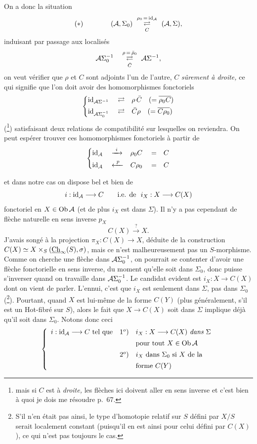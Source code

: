 On a donc la situation
\[
(*)\qquad\qquad(\cA,\Sigma_0)\ \underset{C}{\overset{\rho_0\,=\,\id_{\cA}}{\rightleftarrows}}\ (\cA,\Sigma),
\]
induisant par passage aux localisés
\[
\cA\Sigma_0^{-1}\quad\underset{\bar{C}}{\overset{\rho\,=\,\bar{\rho}_0}{\rightleftarrows}}\ \cA\Sigma^{-1},
\]
on veut vérifier que $\rho$ et $C$ sont adjoints l'un de l'autre, $C$ \textit{sûrement à droite,} ce qui signifie que l'on doit avoir des homomorphismes fonctoriels
\[
\left\{
\begin{aligned}
&\mathrm{id}_{\mathcal{A}\Sigma^{-1}}&&\rightleftarrows&&\rho\,\bar{C}\quad(=\overline{\rho_0C})\\
&\mathrm{id}_{\mathcal{A}\Sigma_0^{-1}}&&\rightleftarrows&&\bar{C}\rho\quad(=\overline{C\rho_0})
\end{aligned}
\right.
\]
(\footnote[41]{mais si $C$ est à \textit{droite,} les flèches ici doivent aller en sens inverse et c'est bien à quoi je dois me résoudre p.~67.}) satisfaisant deux relations de compatibilité sur lesquelles on reviendra. On peut espérer trouver ces homomorphismes fonctoriels à partir de
\[
\left\{
\begin{aligned}
&\id_{\cA}&&\xrightarrow{\ i\ }&&\rho_0C&&=&&C\\
&\id_{\cA}&&\xleftarrow{\ p\ }&&C\rho_0&&=&&C
\end{aligned}
\right.
\]

et dans notre cas on dispose bel et bien de
\[
i:\mathrm{id}_{\mathcal{A}}\longrightarrow C\qquad\text{i.e. de }\ i_X:X\longrightarrow C(X)
\]
fonctoriel en $X\in\mathrm{Ob}\,\mathcal{A}$ (et de plus $i_X$ est dans $\Sigma$). Il n'y a pas cependant de flèche naturelle en sens inverse $p_X$
\[
C(X)\xrightarrow{\ ?\ }X.
\]
J'avais songé à la projection $\pi_X:C(X)\longrightarrow X$, déduite de la construction $C(X)\simeq X\times_S(\underline{\mathrm{Ch}}_\infty(S),\sigma)$, mais ce n'est malheureusement pas un $S$-morphisme. Comme on cherche une flèche dans $\mathcal{A}\Sigma_0^{-1}$, on pourrait se contenter d'avoir une flèche fonctorielle en sens inverse, du moment qu'elle soit dans $\Sigma_0$, donc puisse s'inverser quand on travaille dans $\mathcal{A}\Sigma_0^{-1}$. Le candidat evident est $i_X:X\longrightarrow C(X)$ dont on vient de parler. L'ennui, c'est que $i_X$ est seulement dans $\Sigma$, pas dans $\Sigma_0$ (\footnote[42]{S'il n'en était pas ainsi, le type d'homotopie relatif sur $S$ défini par $X/S$ serait localement constant (puisqu'il en est ainsi pour celui défini par $C(X)$), ce qui n'est pas toujours le cas.}). Pourtant, quand $X$ est lui-même de la forme $C(Y)$ (plus généralement, s'il est un Hot-fibré sur $S$), alors le fait que $X\longrightarrow C(X)$ soit dans $\Sigma$ implique déjà qu'il soit dans $\Sigma_0$. Notons donc ceci %
\[
\left\{
\begin{array}{lrl}
i:\mathrm{id}_{\mathcal{A}}\longrightarrow C\ \text{tel que} & 1^o) & i_X:X\longrightarrow C(X)\ \textit{dans}\ \Sigma\\[1ex]
 & & \text{pour tout }X\in\mathrm{Ob}\,\mathcal{A}\\[1ex]
 & 2^o) & i_X\ \text{dans }\Sigma_0\text{ si }X\text{ de la}\\[1ex]
 & & \text{forme }C(Y)
\end{array}
\right.
\]

